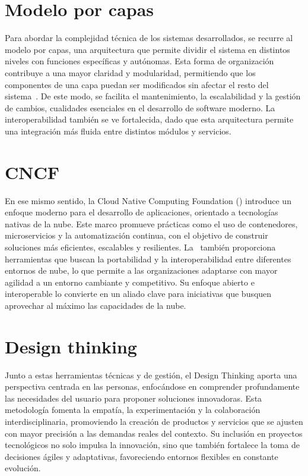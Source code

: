 \section{Modelo por capas}
\noindent
Para abordar la complejidad técnica de los sistemas desarrollados, se recurre al modelo por capas, una arquitectura que permite dividir el sistema en distintos niveles con funciones específicas y autónomas. Esta forma de organización contribuye a una mayor claridad y modularidad, permitiendo que los componentes de una capa puedan ser modificados sin afectar el resto del sistema~\citep{Spray2023}. De este modo, se facilita el mantenimiento, la escalabilidad y la gestión de cambios, cualidades esenciales en el desarrollo de software moderno. La interoperabilidad también se ve fortalecida, dado que esta arquitectura permite una integración más fluida entre distintos módulos y servicios.

\section{CNCF}
\noindent
En ese mismo sentido, la Cloud Native Computing Foundation (\CNCF) introduce un enfoque moderno para el desarrollo de aplicaciones, orientado a tecnologías nativas de la nube. Este marco promueve prácticas como el uso de contenedores, microservicios y la automatización continua, con el objetivo de construir soluciones más eficientes, escalables y resilientes\citep{CNCF2023}. La \CNCF\ también proporciona herramientas que buscan la portabilidad y la interoperabilidad entre diferentes entornos de nube, lo que permite a las organizaciones adaptarse con mayor agilidad a un entorno cambiante y competitivo. Su enfoque abierto e interoperable lo convierte en un aliado clave para iniciativas que busquen aprovechar al máximo las capacidades de la nube.

\section{Design thinking}
\noindent
Junto a estas herramientas técnicas y de gestión, el Design Thinking aporta una perspectiva centrada en las personas, enfocándose en comprender profundamente las necesidades del usuario para proponer soluciones innovadoras\citep{CombellesC.LucenaP.2020}. Esta metodología fomenta la empatía, la experimentación y la colaboración interdisciplinaria, promoviendo la creación de productos y servicios que se ajusten con mayor precisión a las demandas reales del contexto. Su inclusión en proyectos tecnológicos no solo impulsa la innovación, sino que también fortalece la toma de decisiones ágiles y adaptativas, favoreciendo entornos flexibles en constante evolución.

